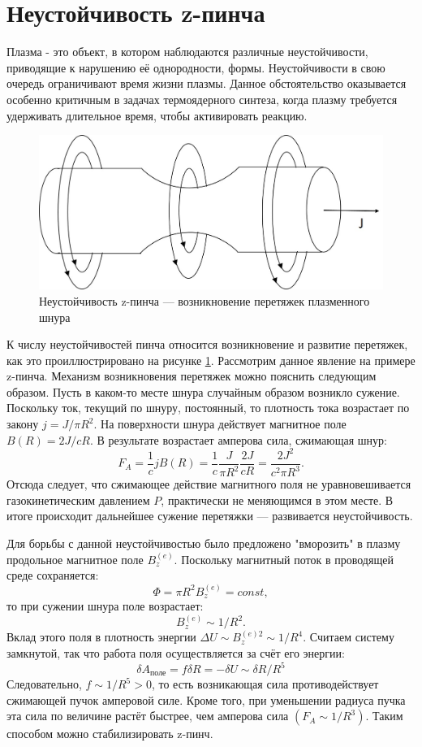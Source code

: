 \documentclass[12pt]{kiarticle} %
\begin{document}
	\section{Неустойчивость z-пинча}
	Плазма - это объект, в котором наблюдаются различные неустойчивости, приводящие к нарушению её однородности, формы. Неустойчивости в свою очередь ограничивают время жизни плазмы. Данное обстоятельство оказывается особенно критичным в задачах термоядерного синтеза, когда плазму требуется удерживать длительное время, чтобы активировать реакцию.
		\begin{figure} 
		\includegraphics[width=\linewidth]{Pic4.jpg}
		\caption{Неустойчивость z-пинча --- возникновение перетяжек плазменного шнура}
		\label{Pic4}
	\end{figure}
	\par К числу неустойчивостей пинча относится возникновение и развитие перетяжек, как это проиллюстрировано на рисунке \ref{Pic4}. Рассмотрим данное явление на примере z-пинча. Механизм возникновения перетяжек можно пояснить следующим образом. Пусть в каком-то месте шнура случайным образом возникло сужение. Поскольку ток, текущий по шнуру, постоянный, то плотность тока возрастает по закону $j = J/ \pi R^2$. На поверхности шнура действует магнитное поле $B(R) = 2J/cR$. В результате возрастает амперова сила, сжимающая шнур:
	\[  F_A = \dfrac{1}{c}jB(R) = \dfrac{1}{c} \dfrac{J}{\pi R^2} \dfrac{2J}{cR} = \dfrac{2J^2}{c^2\pi R^3}.  \]
	Отсюда следует, что сжимающее действие магнитного поля не уравновешивается газокинетическим давлением $P$, практически не меняющимся в этом месте. В итоге происходит дальнейшее сужение перетяжки --- развивается неустойчивость.
	\par Для борьбы с данной неустойчивостью было предложено "вморозить" в плазму продольное магнитное поле $B_z^{(e)}$. Поскольку магнитный поток в проводящей среде сохраняется:
	\[ \Phi = \pi R^2 B_z^{(e)} = const,  \]
	то при сужении шнура поле возрастает:
	\[ B_z^{(e)} \sim 1/R^2.  \]
	Вклад этого поля в плотность энергии $\varDelta U \sim B_z^{(e)2} \sim 1/R^4.$ Считаем систему замкнутой, так что работа поля осуществляется за счёт его энергии:
	\[ \delta A_{поле} = f\delta R = -\delta U \sim \delta R/R^5 \]
	Следовательно, $f \sim 1/R^5 > 0$, то есть возникающая сила противодействует сжимающей пучок амперовой силе. Кроме того, при уменьшении радиуса пучка эта сила по величине растёт быстрее, чем амперова сила $(F_A \sim 1/R^3)$. Таким способом можно стабилизировать z-пинч.
\end{document}
